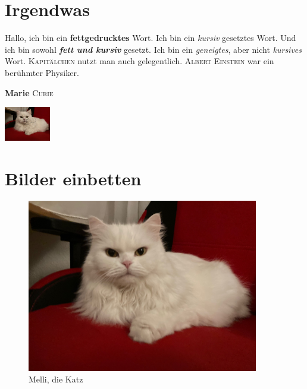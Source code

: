 \documentclass[12pt,ngerman,parskip=half]{scrreprt}
\newcommand{\physiker}[1]{\textcolor{FUH}{\textsc{#1}}}
\newcommand{\Physiker}[2]{\textcolor{fuh}{\textbf{#1} \textsc{#2}}}
\begin{document}
\blindtext[1] 

\chapter{Irgendwas}

Hallo, ich bin ein \textbf{fettgedrucktes} Wort. Ich bin ein \textit{kursiv} gesetztes Wort. Und ich bin sowohl \textbf{\textit{fett und kursiv}} gesetzt. Ich bin ein \textsl{geneigtes}, aber nicht \textit{kursives} Wort. \textsc{Kapitälchen} nutzt man auch gelegentlich. \physiker{Albert Einstein} war ein berühmter Physiker.

\Physiker{Marie}{Curie}

\includegraphics[width=2cm]{./Bilder/Katze} %


\chapter{Bilder einbetten}

\blindtext

\begin{figure}[h] %
\begin{center} %
\includegraphics[width=0.9\textwidth]{./Bilder/Katze.jpg} %
\caption{Melli, die Katz}\label{fig:katze}
\end{center}
\end{figure}
\end{document}
